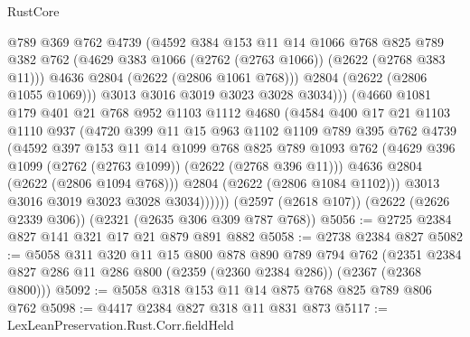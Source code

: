 \begin{lexlean}{RustCore}
\begin{coremodule}
                    @789
                    @369
                    @762
                    @4739
                    (@4592
                      @384
                      @153
                      @11
                      @14
                      @1066
                      @768
                      @825
                      @789
                      @382
                      @762
                      (@4629 @383 @1066 (@2762 (@2763 @1066)) (@2622 (@2768 @383 @11)))
                      @4636
                      @2804
                      (@2622 (@2806 @1061 @768)))
                    @2804
                    (@2622 (@2806 @1055 @1069)))
                  @3013
                  @3016
                  @3019
                  @3023
                  @3028
                  @3034)))
            (@4660
              @1081
              @179
              @401
              @21
              @768
              @952
              @1103
              @1112
              @4680
              (@4584
                @400
                @17
                @21
                @1103
                @1110
                @937
                (@4720
                  @399
                  @11
                  @15
                  @963
                  @1102
                  @1109
                  @789
                  @395
                  @762
                  @4739
                  (@4592
                    @397
                    @153
                    @11
                    @14
                    @1099
                    @768
                    @825
                    @789
                    @1093
                    @762
                    (@4629 @396 @1099 (@2762 (@2763 @1099)) (@2622 (@2768 @396 @11)))
                    @4636
                    @2804
                    (@2622 (@2806 @1094 @768)))
                  @2804
                  (@2622 (@2806 @1084 @1102)))
                @3013
                @3016
                @3019
                @3023
                @3028
                @3034))))))
    (@2597 (@2618 @107))
    (@2622 (@2626 @2339 @306))
    (@2321 (@2635 @306 @309 @787 @768))
@5056 := @2725 @2384 @827 @141 @321 @17 @21 @879 @891 @882
@5058 := @2738 @2384 @827
@5082 := @5058
    @311
    @320
    @11
    @15
    @800
    @878
    @890
    @789
    @794
    @762
    (@2351 @2384 @827 @286 @11 @286 @800 (@2359 (@2360 @2384 @286)) (@2367 (@2368 @800)))
@5092 := @5058 @318 @153 @11 @14 @875 @768 @825 @789 @806 @762
@5098 := @4417 @2384 @827 @318 @11 @831 @873
@5117 := LexLeanPreservation.Rust.Corr.fieldHeld

\end{coremodule}
\end{lexlean}
